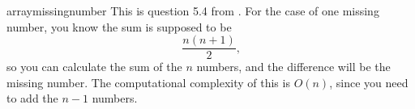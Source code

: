 \begin{answer}{arraymissingnumber}
This is question 5.4 from \citet{JoshiQA}.
For the case of one missing number, you know the sum is supposed to be
\[
  \frac{n (n+1) }{2}
  \text{,}
\]
so you can calculate the sum of the $n$ numbers, and the difference will be the missing number.
The computational complexity of this is $O(n)$, since you need to add the $n-1$ numbers.
\end{answer}